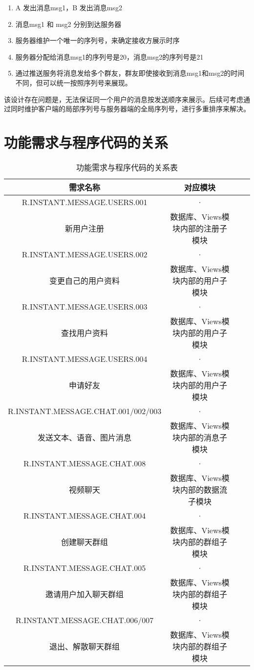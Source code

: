 {\begin{enumerate}
	\item A 发出消息msg1，B 发出消息msg2
	\item 消息msg1 和 msg2 分别到达服务器
	\item 服务器维护一个唯一的序列号，来确定接收方展示时序
	\item 服务器分配给消息msg1的序列号是20，消息msg2的序列号是21
	\item 通过推送服务将消息发给多个群友，群友即使接收到消息msg1和msg2的时间不同，但可以统一按照序列号来展现。
\end{enumerate}
该设计存在问题是，无法保证同一个用户的消息按发送顺序来展示。后续可考虑通过同时维护客户端的局部序列号与服务器端的全局序列号，进行多重排序来解决。
}

\section{功能需求与程序代码的关系}
\begin{table}[htbp]
\centering
\caption{功能需求与程序代码的关系表} \label{tab:requirement-module}
\begin{tabular}{|c|c|c|c|}
    \hline
    需求名称  & 对应模块 \\
    \hline
	R.INSTANT.MESSAGE.USERS.001 & · \\
	新用户注册 & 数据库、Views模块内部的注册子模块 \\
    \hline
	R.INSTANT.MESSAGE.USERS.002 & · \\
	变更自己的用户资料 & 数据库、Views模块内部的用户子模块 \\
    \hline
	R.INSTANT.MESSAGE.USERS.003 & · \\
	查找用户资料 & 数据库、Views模块内部的用户子模块\\
	\hline
	R.INSTANT.MESSAGE.USERS.004 & · \\
	申请好友 & 数据库、Views模块内部的用户子模块 \\
	\hline
	R.INSTANT.MESSAGE.CHAT.001/002/003 & · \\
	发送文本、语音、图片消息 & 数据库、Views模块内部的消息子模块 \\
	\hline
	R.INSTANT.MESSAGE.CHAT.008 & · \\
	视频聊天 & 数据库、Views模块内部的数据流子模块 \\
	\hline
	R.INSTANT.MESSAGE.CHAT.004 & · \\
	创建聊天群组 & 数据库、Views模块内部的群组子模块 \\
    \hline
	R.INSTANT.MESSAGE.CHAT.005 & · \\
	邀请用户加入聊天群组 & 数据库、Views模块内部的群组子模块 \\
	\hline
	R.INSTANT.MESSAGE.CHAT.006/007 & · \\
	退出、解散聊天群组 & 数据库、Views模块内部的群组子模块 \\
	\hline
	\hline
\end{tabular}
\end{table}